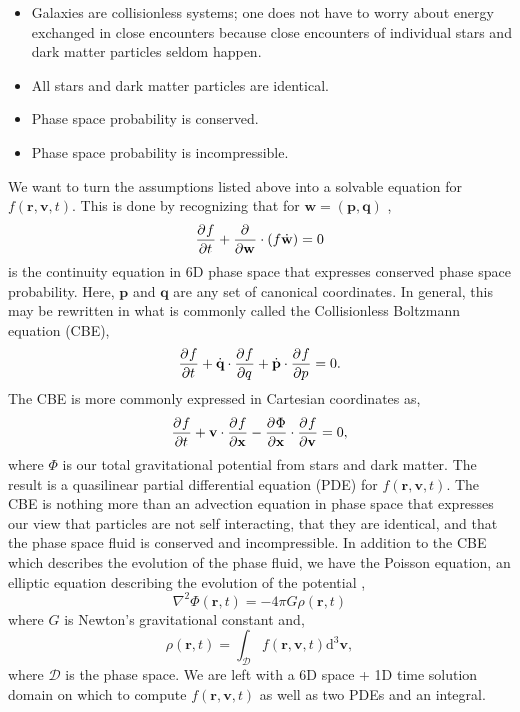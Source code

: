 \begin{itemize}
\item Galaxies are collisionless systems; one does not have to worry about energy exchanged in close encounters because close encounters of individual stars and dark matter particles seldom happen.
\item All stars and dark matter particles are identical.
\item Phase space probability is conserved.
\item Phase space probability is incompressible.
\end{itemize}
We want to turn the assumptions listed above into a solvable equation for $f(\textbf{r},\textbf{v},t)$. This is done by recognizing that  for $\textbf{w} = (\textbf{p}, \textbf{q})$ \citep{BT},
\begin{equation}
\frac{\partial^{} {f}}{\partial {t}^{}} + \frac{\partial^{} {}}{\partial {\textbf{w}}^{}} \cdot \left( f \dot{\textbf{w}}\right) = 0
\end{equation}
is the continuity equation in 6D phase space that expresses conserved phase space probability. Here, $\textbf{p}$ and $\textbf{q}$ are any set of canonical coordinates. In general, this may be rewritten in what is commonly called the Collisionless Boltzmann equation (CBE),
\begin{equation}
\frac{\partial^{} {f}}{\partial {t}^{}} + \dot{\textbf{q}} \cdot \frac{\partial^{} {f}}{\partial {q}^{}} + \dot{\textbf{p}} \cdot \frac{\partial^{} {f}}{\partial {p}^{}} = 0.
\end{equation}
The CBE is more commonly expressed in Cartesian coordinates as,
\begin{equation}
\frac{\partial^{} {f}}{\partial {t}^{}} + \textbf{v} \cdot \frac{\partial^{} {f}}{\partial {\textbf{x}}^{}} - \frac{\partial^{} {\Phi}}{\partial {\textbf{x}}^{}} \cdot \frac{\partial^{} {f}}{\partial {\textbf{v}}^{}} = 0, \label{eq:cbe_cartesian}
\end{equation}
where $\Phi$ is our total gravitational potential from stars and dark matter. The result is a quasilinear partial differential equation (PDE) for $f(\textbf{r},\textbf{v},t)$. The CBE is nothing more than an advection equation in phase space that expresses our view that particles are not self interacting, that they are identical, and that the phase space fluid is conserved and incompressible. In addition to the CBE which describes the evolution of the phase fluid, we have the Poisson equation, an elliptic equation describing the evolution of the potential \citep{BT},
\begin{equation}
\nabla^2 \Phi(\textbf{r},t) = -4 \pi G \rho(\textbf{r},t) \label{eq:poisson}
\end{equation} 
where $G$ is Newton's gravitational constant and,
\begin{equation}
\rho(\textbf{r},t) = \int_{\mathcal{D}} f(\textbf{r}, \textbf{v}, t) \text{d}^3 \textbf{v},
\end{equation}
where $\mathcal{D}$ is the phase space. We are left with a 6D space + 1D time solution domain on which to compute $f(\textbf{r},\textbf{v},t)$ as well as two PDEs and an integral.

